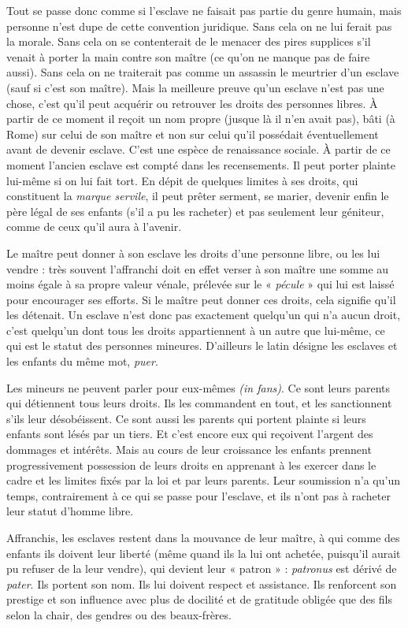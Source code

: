 Tout se passe donc comme si l'esclave ne faisait pas partie du genre
humain, mais personne n'est dupe de cette convention juridique. Sans
cela on ne lui ferait pas la morale. Sans cela on se contenterait de le menacer
des pires supplices s'il venait à porter la main contre son maître (ce
qu'on ne manque pas de faire aussi). Sans cela on ne traiterait pas comme
un assassin le meurtrier d'un esclave (sauf si c'est son maître). Mais la
meilleure preuve qu'un esclave n'est pas une chose, c'est qu'il peut acquérir
ou retrouver les droits des personnes libres. À partir de ce moment il
reçoit un nom propre (jusque là il n'en avait pas), bâti (à Rome) sur celui
de son maître et non sur celui qu'il possédait éventuellement avant de
devenir esclave. C'est une espèce de renaissance sociale. À partir de ce
moment l'ancien esclave est compté dans les recensements. Il peut porter
plainte lui-même si on lui fait tort. En dépit de quelques limites à ses
droits, qui constituent la \emph{marque servile}, il peut prêter serment, se marier,
devenir enfin le père légal de ses enfants (s'il a pu les racheter) et pas seulement
leur géniteur, comme de ceux qu'il aura à l'avenir.

Le maître peut donner à son esclave les droits d'une personne libre,
ou les lui vendre : très souvent l'affranchi doit en effet verser à son
maître une somme au moins égale à sa propre valeur vénale, prélevée sur
le « \emph{pécule} » qui lui est laissé pour encourager ses efforts. Si le maître peut
donner ces droits, cela signifie qu'il les détenait. Un esclave n'est donc
pas exactement quelqu'un qui n'a aucun droit, c'est quelqu'un dont tous
les droits appartiennent à un autre que lui-même, ce qui est le statut des
personnes mineures. D'ailleurs le latin désigne les esclaves et les enfants
du même mot, \emph{puer}.

Les mineurs ne peuvent parler pour eux-mêmes \emph{(in fans)}. Ce sont
leurs parents qui détiennent tous leurs droits. Ils les commandent en
tout, et les sanctionnent s'ils leur désobéissent. Ce sont aussi les parents
qui portent plainte si leurs enfants sont lésés par un tiers. Et c'est encore
eux qui reçoivent l'argent des dommages et intérêts. Mais au cours de
leur croissance les enfants prennent progressivement possession de leurs
droits en apprenant à les exercer dans le cadre et les limites fixés par la
loi et par leurs parents. Leur soumission n'a qu'un temps, contrairement
à ce qui se passe pour l'esclave, et ils n'ont pas à racheter leur statut
d'homme libre.

Affranchis, les esclaves restent dans la mouvance de
leur maître, à qui comme des enfants ils doivent leur liberté (même
quand ils la lui ont achetée, puisqu'il aurait pu refuser de la leur vendre),
qui devient leur « patron » : \emph{patronus} est dérivé de \emph{pater}. Ils portent son
nom. Ils lui doivent respect et assistance. Ils renforcent son prestige et
son influence avec plus de docilité et de gratitude obligée que des fils selon
la chair, des gendres ou des beaux-frères.


